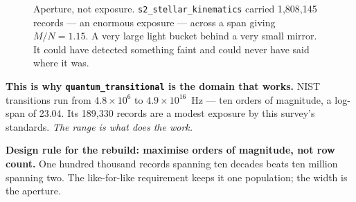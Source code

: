 \documentclass[11pt, letterpaper, openany]{book}
\begin{document}
\begin{figure}[H]
\centering
{}
\caption{Aperture, not exposure. \texttt{s2\_stellar\_kinematics} carried 1{,}808{,}145 records
--- an enormous exposure --- across a span giving $M/N = 1.15$. A very large light bucket behind
a very small mirror. It could have detected something faint and could never have said where it
was.}
\end{figure}

\begin{signalbox}
\textbf{This is why \texttt{quantum\_transitional} is the domain that works.} NIST transitions
run from $4.8 \times 10^{6}$ to $4.9 \times 10^{16}$~Hz --- ten orders of magnitude, a log-span
of 23.04. Its 189{,}330 records are a modest exposure by this survey's standards. \emph{The
range is what does the work.}
\end{signalbox}

\begin{warningbox}
\textbf{Design rule for the rebuild: maximise orders of magnitude, not row count.} One hundred
thousand records spanning ten decades beats ten million spanning two. The like-for-like
requirement keeps it one population; the width is the aperture.
\end{warningbox}
\end{document}
